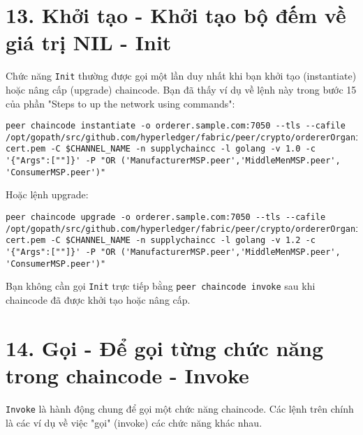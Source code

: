 \documentclass{article}
\begin{document}
\section{13. Khởi tạo - Khởi tạo bộ đếm về giá trị NIL - Init}

Chức năng \texttt{Init} thường được gọi một lần duy nhất khi bạn khởi tạo (instantiate) hoặc nâng cấp (upgrade) chaincode. Bạn đã thấy ví dụ về lệnh này trong bước 15 của phần "Steps to up the network using commands":

\begin{lstlisting}[breaklines=true]
peer chaincode instantiate -o orderer.sample.com:7050 --tls --cafile /opt/gopath/src/github.com/hyperledger/fabric/peer/crypto/ordererOrganizations/sample.com/orderers/orderer.sample.com/msp/tlscacerts/tlsca.sample.com-cert.pem -C $CHANNEL_NAME -n supplychaincc -l golang -v 1.0 -c '{"Args":[""]}' -P "OR ('ManufacturerMSP.peer','MiddleMenMSP.peer', 'ConsumerMSP.peer')"
\end{lstlisting}

Hoặc lệnh upgrade:

\begin{lstlisting}[breaklines=true]
peer chaincode upgrade -o orderer.sample.com:7050 --tls --cafile /opt/gopath/src/github.com/hyperledger/fabric/peer/crypto/ordererOrganizations/sample.com/orderers/orderer.sample.com/msp/tlscacerts/tlsca.sample.com-cert.pem -C $CHANNEL_NAME -n supplychaincc -l golang -v 1.2 -c '{"Args":[""]}' -P "OR ('ManufacturerMSP.peer','MiddleMenMSP.peer', 'ConsumerMSP.peer')"
\end{lstlisting}

Bạn không cần gọi \texttt{Init} trực tiếp bằng \texttt{peer chaincode invoke} sau khi chaincode đã được khởi tạo hoặc nâng cấp.

\section{14. Gọi - Để gọi từng chức năng trong chaincode - Invoke}

\texttt{Invoke} là hành động chung để gọi một chức năng chaincode. Các lệnh trên chính là các ví dụ về việc "gọi" (invoke) các chức năng khác nhau.
\end{document}
